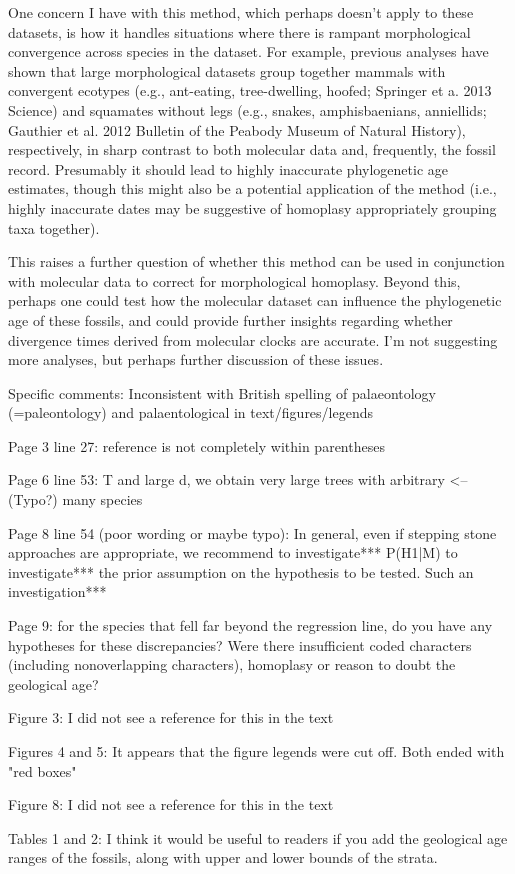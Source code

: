 \documentclass[11pt]{article}
\begin{document}
One concern I have with this method, which perhaps doesn't apply to these datasets, is how it handles situations where there is rampant morphological convergence across species in the dataset. For example, previous analyses have shown that large morphological datasets group together mammals with convergent ecotypes (e.g., ant-eating, tree-dwelling, hoofed; Springer et a. 2013 Science) and squamates without legs (e.g., snakes, amphisbaenians, anniellids; Gauthier et al. 2012 Bulletin of the Peabody Museum of Natural History), respectively, in sharp contrast to both molecular data and, frequently, the fossil record. Presumably it should lead to highly inaccurate phylogenetic age estimates, though this might also be a potential application of the method (i.e., highly inaccurate dates may be suggestive of homoplasy appropriately grouping taxa together).

This raises a further question of whether this method can be used in conjunction with molecular data to correct for morphological homoplasy. Beyond this, perhaps one could test how the molecular dataset can influence the phylogenetic age of these fossils, and could provide further insights regarding whether divergence times derived from molecular clocks are accurate. I'm not suggesting more analyses, but perhaps further discussion of these issues.

Specific comments:
Inconsistent with British spelling of palaeontology (=paleontology) and palaentological in text/figures/legends

Page 3 line 27: reference is not completely within parentheses

Page 6 line 53: T and large d, we obtain very large trees with arbitrary <--(Typo?) many species

Page 8 line 54 (poor wording or maybe typo): In general, even if stepping stone approaches are appropriate, we recommend to investigate*** P(H1|M) to investigate*** the prior assumption on the hypothesis to be tested. Such an investigation***

Page 9: for the species that fell far beyond the regression line, do you have any hypotheses for these discrepancies? Were there insufficient coded characters (including nonoverlapping characters), homoplasy or reason to doubt the geological age?

Figure 3: I did not see a reference for this in the text

Figures 4 and 5: It appears that the figure legends were cut off. Both ended with "red boxes"

Figure 8: I did not see a reference for this in the text

Tables 1 and 2: I think it would be useful to readers if you add the geological age ranges of the fossils, along with upper and lower bounds of the strata.




\end{document}
